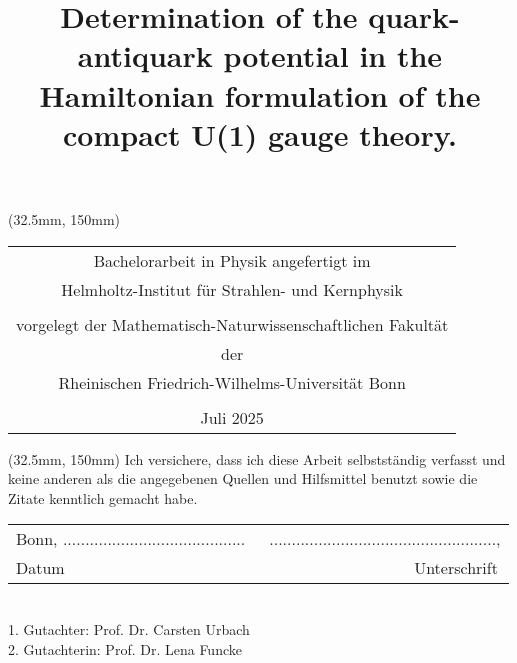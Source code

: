 \documentclass[sn-mathphys-num,iicol]{sn-jnl}
\theoremstyle{thmstyleone}
\theoremstyle{thmstyletwo}
\theoremstyle{thmstylethree}
\begin{document}
\title[]{Determination of the quark-antiquark potential in the Hamiltonian formulation of the compact U(1) gauge theory.}
\author{ }

\maketitle
\begingroup
\renewcommand{\arraystretch}{1.8}
\begin{textblock*}{140mm}(32.5mm, 150mm)
	\begin{center}
		\begin{tabular}{c}
			\large{Bachelorarbeit in Physik angefertigt im}                     \\
			\large{Helmholtz-Institut für Strahlen- und Kernphysik}             \\
			\\
			\large{vorgelegt der Mathematisch-Naturwissenschaftlichen Fakultät} \\
			\large{der}                                                         \\
			\large{Rheinischen Friedrich-Wilhelms-Universität Bonn}             \\
			\\
			\large{Juli 2025}
		\end{tabular}
	\end{center}
\end{textblock*}
\endgroup

\clearpage
{}
\setcounter{page}{2}
\begin{textblock*}{140mm}(32.5mm, 150mm)
	Ich versichere, dass ich diese Arbeit selbstständig verfasst und keine anderen als die angegebenen Quellen und Hilfsmittel benutzt sowie die Zitate kenntlich gemacht habe.\\[40pt]
	\begin{center}
		\begin{tabular}{lr}
			Bonn, ......................................... \hspace{3cm}\, & ..................................................., \\
			\hspace{2cm}Datum                                              & Unterschrift\hspace{1.5cm}\,
		\end{tabular}
	\end{center}
	\,\\[20pt]
	1. Gutachter: Prof. Dr. Carsten Urbach \\
	2. Gutachterin: Prof. Dr. Lena Funcke
\end{textblock*}
\end{document}
